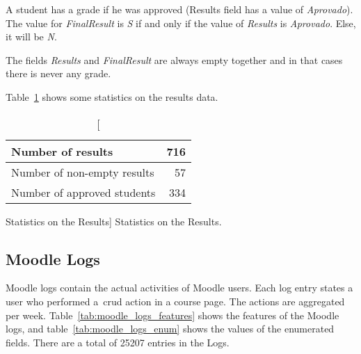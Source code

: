 A student has a grade if he was approved (Results field has a value of
\textit{Aprovado}). The value for \textit{FinalResult} is \textit{S} if and
only if the value of \textit{Results} is \textit{Aprovado}. Else, it will be
\textit{N}.

The fields \textit{Results} and \textit{FinalResult} are always empty together
and in that cases there is never any grade.

Table~\ref{tab:results_stats} shows some statistics on the results data.

\begin{table}[h!]
    \centering

    \begin{tabular}{| l | r |}
        \hline
        Number of results           & 716 \\ \hline
        Number of non-empty results & 57  \\ \hline
        Number of approved students & 334 \\ \hline
    \end{tabular}

    \caption
        [Statistics on the Results]
        {Statistics on the Results.}

    \label{tab:results_stats}
\end{table}

\subsection{Moodle Logs}

Moodle logs contain the actual activities of Moodle users. Each log entry
states a user who performed a~\gls{crud} action in a course page. The actions
are aggregated per week. Table~\ref{tab:moodle_logs_features} shows the
features of the Moodle logs, and table~\ref{tab:moodle_logs_enum} shows the
values of the enumerated fields. There are a total of 25207 entries in the
Logs.


